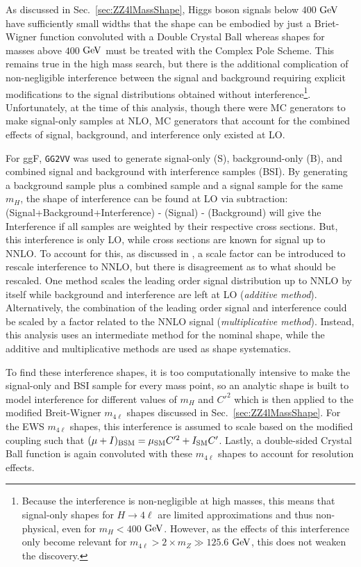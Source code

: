As discussed in Sec.~\ref{sec:ZZ4lMassShape}, Higgs boson signals below $400$ $\rm{GeV}$ have sufficiently small widths that the shape can be embodied by just a Briet-Wigner function convoluted with a Double Crystal Ball whereas shapes for masses above $400$ $\rm{GeV}$ must be treated with the Complex Pole Scheme. This remains true in the high mass search, but there is the additional complication of non-negligible interference between the signal and background \cite{Passarino:2012ri} requiring explicit modifications to the signal distributions obtained without interference\footnote{Because the interference is non-negligible at high masses, this means that signal-only shapes for $H\rightarrow 4\ell$ are limited approximations and thus non-physical, even for $m_{H}<400$ $\rm{GeV}$. However, as the effects of this interference only become relevant for $m_{4\ell} > 2\times m_{Z} \gg 125.6$ $\rm{GeV}$, this does not weaken the discovery.}. Unfortunately, at the time of this analysis, though there were MC generators to make signal-only samples at NLO, MC generators that account for the combined effects of signal, background, and interference only existed at LO.

For ggF, {\tt GG2VV} was used to generate signal-only (S), background-only (B), and combined signal and background with interference samples (BSI). By generating a background sample plus a combined sample and a signal sample for the same $m_H$, the shape of interference can be found at LO via subtraction: (Signal+Background+Interference) - (Signal) - (Background) will give the Interference if all samples are weighted by their respective cross sections. But, this interference is only LO, while cross sections are known for signal up to NNLO. To account for this, as discussed in \cite{HXSWG_Properties}, a scale factor can be introduced to rescale interference to NNLO, but there is disagreement as to what should be rescaled. One method scales the leading order signal distribution up to NNLO by itself while background and interference are left at LO (\textit{additive method}). Alternatively, the combination of the leading order signal and interference could be scaled by a factor related to the NNLO signal (\textit{multiplicative method}). Instead, this analysis uses an intermediate method for the nominal shape, while the additive and multiplicative methods are used as shape systematics.

To find these interference shapes, it is too computationally intensive to make the signal-only and BSI sample for every mass point, so an analytic shape is built to model interference for different values of $m_{H}$ and $C'^2$ which is then applied to the modified Breit-Wigner $m_{4\ell}$ shapes discussed in Sec.~\ref{sec:ZZ4lMassShape}. For the EWS $m_{4\ell}$ shapes, this interference is assumed to scale based on the modified coupling such that $(\mu + I)_{\rm{BSM}} = \mu_{\rm{SM}}C'^2 + I_{\rm{SM}}C'$. Lastly, a double-sided Crystal Ball function is again convoluted with these $m_{4\ell}$ shapes to account for resolution effects. 

